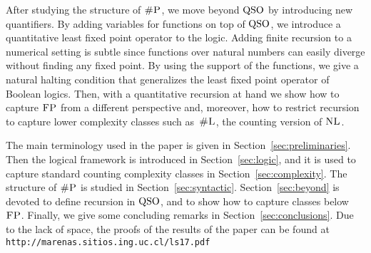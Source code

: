 After studying the 
structure of $\text{\sc \#P}$, we move beyond ${\rm QSO}$ by introducing new quantifiers. 
By adding variables for functions on top of ${\rm QSO}$, we introduce a quantitative least fixed point operator to the logic. 
Adding finite recursion to a numerical setting is subtle since functions over natural numbers can easily diverge without finding any fixed point. 
By using the support of the functions, we give a natural halting condition that generalizes the least fixed point operator of Boolean logics.
Then, with a quantitative recursion at hand we show how to capture $\text{\sc FP}$ from a different perspective and, moreover, how to restrict recursion to capture lower complexity classes 
such as~$\text{\sc \#L}$, the counting version of $\text{\sc NL}$.

\smallskip

 The main terminology used in the paper is given in Section~\ref{sec:preliminaries}. Then the logical framework is introduced in Section~\ref{sec:logic}, and it is used to capture standard counting complexity classes in Section~\ref{sec:complexity}. The structure of $\text{\sc \#P}$ is studied in Section~\ref{sec:syntactic}. Section~\ref{sec:beyond} is devoted to define recursion in ${\rm QSO}$, and to show how to capture classes below $\text{\sc FP}$. 
Finally, we give some concluding remarks in Section~\ref{sec:conclusions}. 
Due to the lack of space, the %
proofs of the results of the paper can be found at 
\verb+http://marenas.sitios.ing.uc.cl/ls17.pdf+



